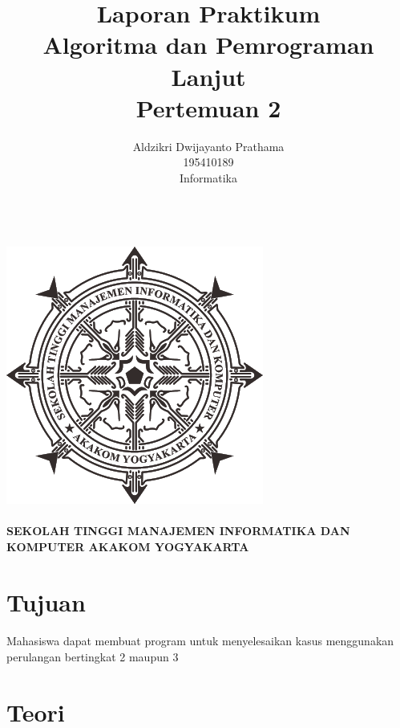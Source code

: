 \documentclass[a4paper,12pt]{article}
\begin{document}
\title{ {\Large Laporan Praktikum}\\ Algoritma dan Pemrograman Lanjut\\{\Large Pertemuan 2}}

\author{Aldzikri Dwijayanto Prathama 
	\\195410189
	\\Informatika}
\makeatletter
\begin{titlepage}
	\begin{center}
		{\huge \bfseries \@title }\\[14ex]
		\includegraphics[scale=.8]{logo}\\[4ex]
		{\large \@author}\\[12ex]
		{\large \bfseries {SEKOLAH TINGGI MANAJEMEN INFORMATIKA DAN KOMPUTER
				AKAKOM YOGYAKARTA}}
	\end{center}


\end{titlepage}
\makeatother
\newpage
\tableofcontents
\newpage

\section{Tujuan}
\paragraph{}
Mahasiswa dapat membuat program untuk menyelesaikan kasus menggunakan
perulangan bertingkat 2 maupun 3

\section{Teori}
\end{document}
